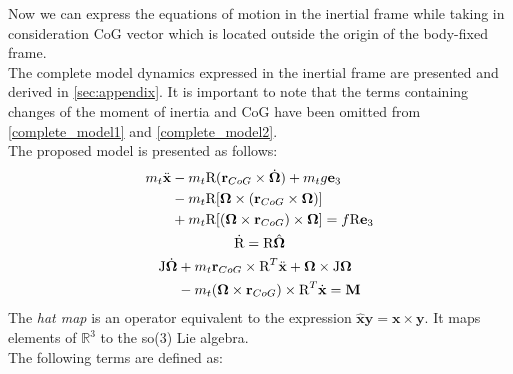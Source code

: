 Now we can express the equations of motion in the inertial frame while taking in consideration CoG vector which is located outside the origin of the body-fixed frame\cite{LeeModel}. \\
The complete model dynamics expressed in the inertial frame are presented and derived in \ref{sec:appendix}. It is important to note that the terms containing changes of the moment of inertia and CoG have been omitted from \eqref{complete_model1} and \eqref{complete_model2}.\\
The proposed model is presented as follows: 
\begin{gather}
	\label{model2}
	\begin{align}
		\begin{split}
			m_t \ddot{\textbf{x}} & - m_t \text{R}(\textbf{r}_{CoG} \times \dot{\boldsymbol{\Omega}}) + m_t g\textbf{e}_3 \\
			& - m_t \text{R}[\boldsymbol{\Omega} \times (\textbf{r}_{CoG} \times \boldsymbol{\Omega})]\\
			& + m_t \text{R}[(\boldsymbol{\Omega} \times \textbf{r}_{CoG}) \times \boldsymbol{\Omega}] = f\text{R}\textbf{e}_3 
		\end{split} 
	\end{align} \\
	\dot{\text{R}} = \text{R}\hat{\boldsymbol{\Omega}} \label{model3} \\
	\label{model4}
	\begin{align}
		\begin{split}
			\text{J}\dot{\boldsymbol{\Omega}} & + m_t\textbf{r}_{CoG} \times \text{R}^T\ddot{\textbf{x}} + \boldsymbol{\Omega} \times \text{J}\boldsymbol{\Omega}  \\
			& - m_t (\boldsymbol{\Omega} \times \textbf{r}_{CoG}) \times \text{R}^T \dot{\textbf{x}} = \textbf{M}
		\end{split}
	\end{align}
\end{gather}
The \textit{hat map} is an operator equivalent to the expression $\hat{\textbf{x}}\textbf{y} = \textbf{x} \times \textbf{y}$. It maps elements of $\mathbb{R}^3$ to the so(3) Lie algebra. \\
\noindent The following terms are defined as:

